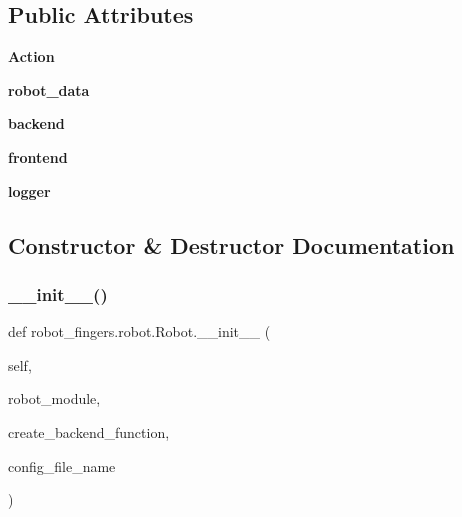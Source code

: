\subsection*{Public Attributes}
\begin{DoxyCompactItemize}
\item 
\mbox{\label{classrobot__fingers_1_1robot_1_1Robot_a2a0232b3acf259eeddb318d312887815}} 
{\bfseries Action}
\item 
\mbox{\label{classrobot__fingers_1_1robot_1_1Robot_a727813d76f35690ee282446d082c943e}} 
{\bfseries robot\+\_\+data}
\item 
\mbox{\label{classrobot__fingers_1_1robot_1_1Robot_a0ae4a629cc745c551fe6941eeeb19523}} 
{\bfseries backend}
\item 
\mbox{\label{classrobot__fingers_1_1robot_1_1Robot_ac538343aab9e49a97c202da1cee4e030}} 
{\bfseries frontend}
\item 
\mbox{\label{classrobot__fingers_1_1robot_1_1Robot_ac0479c96ecf5a2ef5d9e836bb0a1a463}} 
{\bfseries logger}
\end{DoxyCompactItemize}


\subsection{Constructor \& Destructor Documentation}
\mbox{\label{classrobot__fingers_1_1robot_1_1Robot_a47fe6f4f534c2e30d129f931b586590f}} 
\subsubsection{\texorpdfstring{\+\_\+\+\_\+init\+\_\+\+\_\+()}{\_\_init\_\_()}}
{\footnotesize\ttfamily def robot\+\_\+fingers.\+robot.\+Robot.\+\_\+\+\_\+init\+\_\+\+\_\+ (\begin{DoxyParamCaption}\item[{}]{self,  }\item[{}]{robot\+\_\+module,  }\item[{}]{create\+\_\+backend\+\_\+function,  }\item[{}]{config\+\_\+file\+\_\+name }\end{DoxyParamCaption})}



